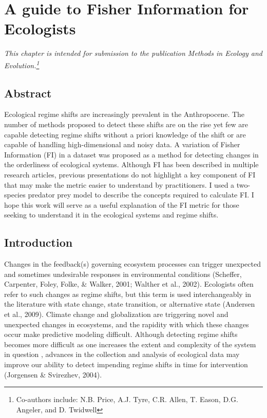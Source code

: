 \documentclass[12pt,twoside,openany]{reedthesis}
\begin{document}
\chapter{A guide to Fisher Information for Ecologists}\label{fiGuide}

\emph{This chapter is intended for submission to the publication
\emph{Methods in Ecology and Evolution}.\footnote{Co-authors include:
  N.B. Price, A.J. Tyre, C.R. Allen, T. Eason, D.G. Angeler, and D.
  Twidwell}}

\section{Abstract}\label{abstract-1}

Ecological regime shifts are increasingly prevalent in the Anthropocene.
The number of methods proposed to detect these shifts are on the rise
yet few are capable detecting regime shifts without a priori knowledge
of the shift or are capable of handling high-dimensional and noisy data.
A variation of Fisher Information (FI) in a dataset was proposed as a
method for detecting changes in the orderliness of ecological systems.
Although FI has been described in multiple research articles, previous
presentations do not highlight a key component of FI that may make the
metric easier to understand by practitioners. I used a two-species
predator prey model to describe the concepts required to calculate FI. I
hope this work will serve as a useful explanation of the FI metric for
those seeking to understand it in the ecological systems and regime
shifts.

\section{Introduction}\label{introduction-1}

Changes in the feedback(s) governing ecosystem processes can trigger
unexpected and sometimes undesirable responses in environmental
conditions (Scheffer, Carpenter, Foley, Folke, \& Walker, 2001; Walther
et al., 2002). Ecologists often refer to such changes as regime shifts,
but this term is used interchangeably in the literature with state
change, state transition, or alternative state (Andersen et al., 2009).
Climate change and globalization are triggering novel and unexpected
changes in ecosystems, and the rapidity with which these changes occur
make predictive modeling difficult. Although detecting regime shifts
becomes more difficult as one increases the extent and complexity of the
system in question , advances in the collection and analysis of
ecological data may improve our ability to detect impending regime
shifts in time for intervention (Jorgensen \& Svirezhev, 2004).
\end{document}
